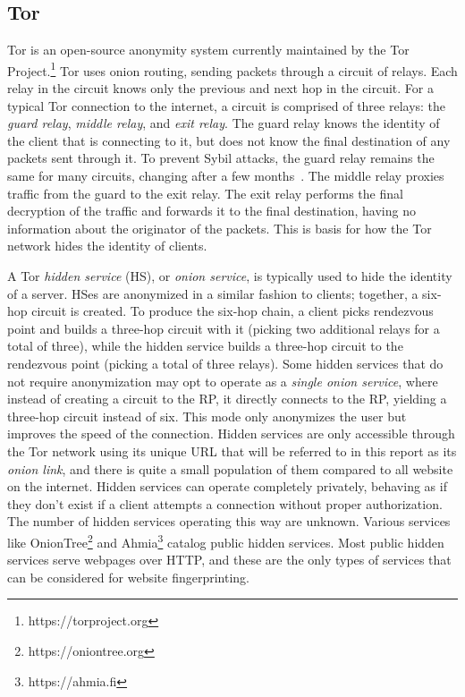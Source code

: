 \documentclass[11pt]{article}
\begin{document}
\subsection{Tor}
Tor is an open-source anonymity system currently maintained by the Tor Project.\footnote{https://torproject.org} Tor uses onion routing, sending packets through a circuit of relays. Each relay in the circuit knows only the previous and next hop in the circuit. For a typical Tor connection to the internet, a circuit is comprised of three relays: the \textit{guard relay}, \textit{middle relay}, and \textit{exit relay}. The guard relay knows the identity of the client that is connecting to it, but does not know the final destination of any packets sent through it. To prevent Sybil attacks, the guard relay remains the same for many circuits, changing after a few months~\cite{sybil}. The middle relay proxies traffic from the guard to the exit relay. The exit relay performs the final decryption of the traffic and forwards it to the final destination, having no information about the originator of the packets.
This is basis for how the Tor network hides the identity of clients.

A Tor \textit{hidden service} (HS), or \textit{onion service}, is typically used to hide the identity of a server. HSes are anonymized in a similar fashion to clients; together, a six-hop circuit is created. To produce the six-hop chain, a client picks rendezvous point and builds a three-hop circuit with it (picking two additional relays for a total of three), while the hidden service builds a three-hop circuit to the rendezvous point (picking a total of three relays). Some hidden services that do not require anonymization may opt to operate as a \textit{single onion service}, where instead of creating a circuit to the RP, it directly connects to the RP, yielding a three-hop circuit instead of six. This mode only anonymizes the user but improves the speed of the connection. Hidden services are only accessible through the Tor network using its unique URL that will be referred to in this report as its \textit{onion link}, and there is quite a small population of them compared to all website on the internet.
Hidden services can operate completely privately, behaving as if they don't exist if a client attempts a connection without proper authorization. The number of hidden services operating this way are unknown.
Various services like OnionTree\footnote{https://oniontree.org} and Ahmia\footnote{https://ahmia.fi} catalog public hidden services. Most public hidden services serve webpages over HTTP, and these are the only types of services that can be considered for website fingerprinting.
\end{document}
